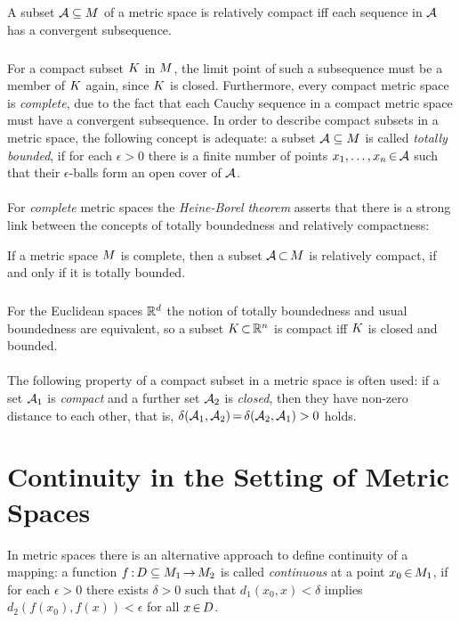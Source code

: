 \documentclass[11pt,twoside]{article}
\begin{document}
\begin{theorem}\label{BOLZANO_WEIERSTRASS_THEOREM}
A subset $\mathcal{A} \subseteq M$ of a metric space is relatively compact
iff each sequence in $\mathcal{A}$ has a convergent subsequence.
\end{theorem}

\subparagraph{}
For a compact subset ${K}$ in $M$,
the limit point of such a subsequence must be a member of ${K}$ again,
since ${K}$ is closed.
Furthermore,
every compact metric space is \textit{complete},
due to the fact that
each Cauchy sequence in a compact metric space
must have a convergent subsequence.
In order to describe compact subsets in a metric space,
the following concept is adequate:
a subset $\mathcal{A} \subseteq M$ is called \textit{totally bounded},
if for each $\epsilon > 0$ there is a finite number of points
$x_1,\ldots,x_n {\,\in\,} \mathcal{A}$
such that their $\epsilon$-balls form an open cover of $\mathcal{A}$.

\paragraph{}
For \textit{complete} metric spaces the \textit{Heine-Borel} \textit{theorem}
asserts
that there is a strong link between the concepts of totally boundedness
and relatively compactness:

\begin{theorem}
If a metric space $M$ is complete,
then a subset $\mathcal{A} {\,\subset\,} M$ is relatively compact,
if and only if it is totally bounded.
\end{theorem}

\subparagraph{}
For the Euclidean spaces ${\mathbb{R}}^d$ the notion of totally boundedness
and usual boundedness are equivalent, 
so a subset ${K} {\,\subset\,} {\mathbb{R}}^n$ is compact
iff ${K}$ is closed and bounded.

\paragraph{}
The following property of a compact subset in a metric space is often used:
if a set $\mathcal{A}_1$ is \textit{compact} and
a further set $\mathcal{A}_2$ is \textit{closed},
then they have non-zero distance to each other,
that is,
$\delta(\mathcal{A}_1,\mathcal{A}_2) {\,=\,} \delta(\mathcal{A}_2,\mathcal{A}_1) > 0$ holds.

\section{Continuity in the Setting of Metric Spaces}                           %
In metric spaces
there is an alternative approach to define continuity of a mapping:
a function $f {\,:\,} D \subseteq M_1 {\,\to\,} M_2$
is called \textit{continuous} at a point $x_0 {\,\in\,} M_1$,
if for each $\epsilon > 0$ there exists $\delta > 0$
such that $d_1(x_0,x) < \delta$ implies $d_2(f(x_0),f(x)) < \epsilon$
for all $x {\,\in\,} D$.
\end{document}

